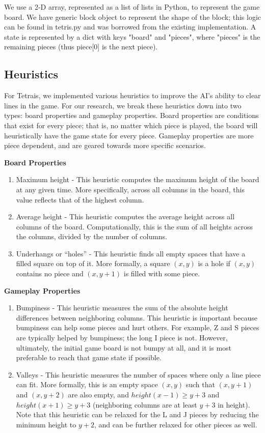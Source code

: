 \documentclass[11pt]{article}
\begin{document}
We use a 2-D array, represented as a list of lists in Python, to represent the game board. We have generic block object to represent the shape of the block; this logic can be found in tetris.py and was borrowed from the existing implementation. A state is represented by a dict with keys "board" and "pieces", where "pieces" is the remaining pieces (thus piece[0] is the next piece).

\subsection{Heuristics}

For Tetrais, we implemented various heuristics to improve the AI’s ability to clear lines in the game. For our research, we break these heuristics down into two types: board properties and gameplay properties. Board properties are conditions that exist for every piece; that is, no matter which piece is played, the board will heuristically have the game state for every piece. Gameplay properties are more piece dependent, and are geared towards more specific scenarios.

\textbf{Board Properties}
\begin{enumerate}
\item Maximum height - This heuristic computes the maximum height of the board at any given time. More specifically, across all columns in the board, this value reflects that of the highest column.
\item Average height - This heuristic computes the average height across all columns of the board. Computationally, this is the sum of all heights across the columns, divided by the number of columns.
\item Underhangs or ``holes'' - This heuristic finds all empty spaces that have a filled square on top of it. More formally, a square $(x,y)$ is a hole if $(x,y)$ contains no piece and $(x, y+1)$ is filled with some piece.
\end{enumerate}

\textbf{Gameplay Properties}
\begin{enumerate}
\item Bumpiness - This heuristic measures the sum of the absolute height differences between neighboring columns. This heuristic is important because bumpiness can help some pieces and hurt others. For example, Z and S pieces are typically helped by bumpiness; the long I piece is not. However, ultimately, the initial game board is not bumpy at all, and it is most preferable to reach that game state if possible.
\item Valleys - This heuristic measures the number of spaces where only a line piece can fit. More formally, this is an empty space $(x, y)$ such that $(x, y+1)$ and $(x, y+2)$ are also empty, and $height(x-1) \geq y+3$ and $height(x+1) \geq y+3$ (neighboring columns are at least $y+3$ in height). Note that this heuristic can be relaxed for the L and J pieces by reducing the minimum height to $y+2$, and can be further relaxed for other pieces as well.
\end{enumerate}
\end{document}
